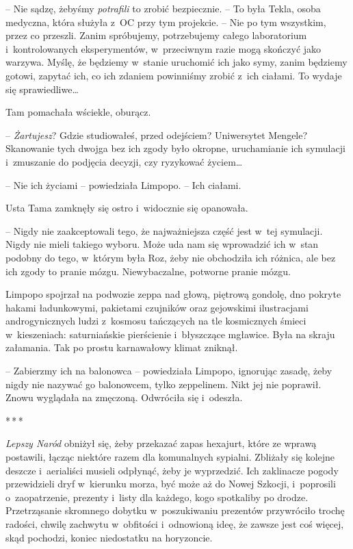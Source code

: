 \documentclass[oneside,polish,11pt,sfheadings]{mwbk}
\newcommand{\threeast}{\bigskip\par\centerline{*\,*\,*}\medskip\par}
\begin{document}
-- Nie sądzę, żebyśmy \textit{potrafili} to zrobić bezpiecznie. -- To była
Tekla, osoba medyczna, która służyła z~OC przy tym projekcie. -- Nie po
tym wszystkim, przez co przeszli. Zanim spróbujemy, potrzebujemy całego
laboratorium i~kontrolowanych eksperymentów, w~przeciwnym razie mogą
skończyć jako warzywa. Myślę, że będziemy w~stanie uruchomić ich jako
symy, zanim będziemy gotowi, zapytać ich, co ich zdaniem powinniśmy
zrobić z~ich ciałami. To wydaje się sprawiedliwe\ldots 

Tam pomachała wściekle, oburącz. 

-- \textit{Żartujesz}? Gdzie studiowałeś,
przed odejściem? Uniwersytet Mengele? Skanowanie tych dwojga bez ich
zgody było okropne, uruchamianie ich symulacji i~zmuszanie do podjęcia
decyzji, czy ryzykować życiem\ldots 

-- Nie ich życiami -- powiedziała Limpopo. -- Ich ciałami.

Usta Tama zamknęły się ostro i~widocznie się opanowała. 

-- Nigdy nie
zaakceptowali tego, że najważniejsza część jest w~tej symulacji. Nigdy
nie mieli takiego wyboru. Może uda nam się wprowadzić ich w~stan podobny
do tego, w~którym była Roz, żeby nie obchodziła ich różnica, ale bez ich
zgody to pranie mózgu. Niewybaczalne, potworne pranie mózgu.

Limpopo spojrzał na podwozie zeppa nad głową, piętrową gondolę, dno
pokryte hakami ładunkowymi, pakietami czujników oraz gejowskimi
ilustracjami androgynicznych ludzi z~kosmosu tańczących na tle
kosmicznych śmieci w~kieszeniach: saturniańskie pierścienie i~błyszczące
mgławice. Była na skraju załamania. Tak po prostu karnawałowy klimat
zniknął.

-- Zabierzmy ich na balonowca -- powiedziała Limpopo, ignorując zasadę,
żeby nigdy nie nazywać go balonowcem, tylko zeppelinem. Nikt jej nie
poprawił. Znowu wyglądała na zmęczoną. Odwróciła się i~odeszła.

\threeast

\textit{Lepszy Naród} obniżył się, żeby przekazać zapas hexajurt, które ze
wprawą postawili, łącząc niektóre razem dla komunalnych sypialni.
Zbliżały się kolejne deszcze i~aerialiści musieli odpłynąć, żeby je
wyprzedzić. Ich zaklinacze pogody przewidzieli dryf w~kierunku morza,
być może aż do Nowej Szkocji, i~poprosili o~zaopatrzenie, prezenty i~listy dla każdego, kogo spotkaliby po drodze. Przetrząsanie skromnego
dobytku w~poszukiwaniu prezentów przywróciło trochę radości, chwilę
zachwytu w~obfitości i~odnowioną ideę, że zawsze jest coś więcej, skąd
pochodzi, koniec niedostatku na horyzoncie.
\end{document}
